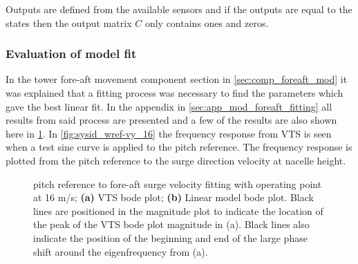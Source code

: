 Outputs are defined from the available sensors and if the outputs are equal to the states then the output matrix $ C $ only contains ones and zeros.

\subsubsection{Evaluation of model fit} \label{sec:lin_fit_eval}
In the tower fore-aft movement component section in \cref{sec:comp_foreaft_mod} it was explained that a fitting process was necessary to find the parameters which gave the best linear fit. In the appendix in \cref{sec:app_mod_foreaft_fitting} all results from said process are presented and a few of the results are also shown here in \cref{fig:wref-vy_16}. In \cref{fig:sysid_wref-vy_16} the frequency response from VTS is seen when a test sine curve is applied to the pitch reference. The frequency response is plotted from the pitch reference to the surge direction velocity at nacelle height.

\begin{figure}[ht]
	\centering
	
	\hfil
	
	\caption{pitch reference to fore-aft surge velocity fitting with operating point at 16 m/s; \textbf{(a)} VTS bode plot; \textbf{(b)} Linear model bode plot. Black lines are positioned in the magnitude plot to indicate the location of the peak of the VTS bode plot magnitude in (a). Black lines also indicate the position of the beginning and end of the large phase shift around the eigenfrequency from (a).}
	\label{fig:wref-vy_16}
\end{figure}


